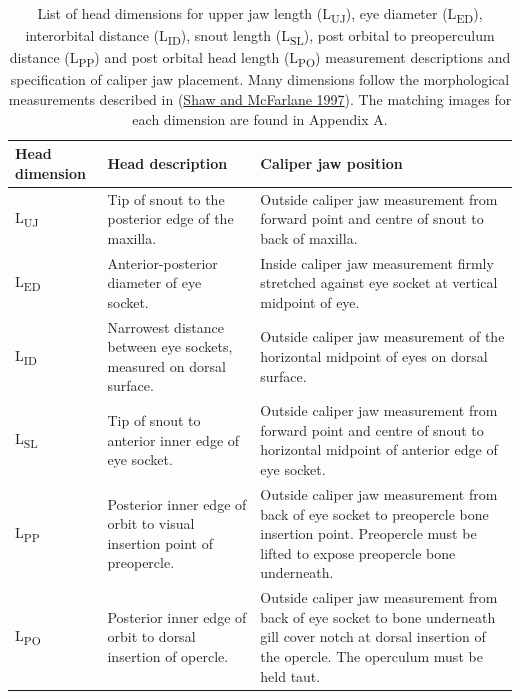 \documentclass[12pt]{article}\usepackage[]{graphicx}\usepackage[]{color}
\begin{document}
\begin{table}[!h]

\caption{\label{tab:table1}List of head dimensions for upper jaw length (L\textsubscript{UJ}), eye diameter (L\textsubscript{ED}), interorbital distance (L\textsubscript{ID}), snout length (L\textsubscript{SL}), post orbital to preoperculum distance (L\textsubscript{PP}) and post orbital head length (L\textsubscript{PO}) measurement descriptions and specification of caliper jaw placement. Many dimensions follow the morphological measurements described in (\protect\hyperlink{ref-Shaw1997}{Shaw and McFarlane 1997}). The matching images for each dimension are found in Appendix A.}
\fontsize{10}{12}\selectfont
\begin{tabular}[t]{>{\raggedright\arraybackslash}p{1.9cm}>{\raggedright\arraybackslash}p{6.0cm}>{\raggedright\arraybackslash}p{7.5cm}}
\toprule
\textbf{Head dimension} & \textbf{Head description} & \textbf{Caliper jaw position}\\
\midrule
L\textsubscript{UJ} & Tip of snout to the posterior edge of the maxilla. & Outside caliper jaw measurement from forward point and centre of snout to back of maxilla.\\
\midrule
L\textsubscript{ED} & Anterior-posterior diameter of eye socket. & Inside caliper jaw measurement firmly stretched against eye socket at vertical midpoint of eye.\\
\midrule
L\textsubscript{ID} & Narrowest distance between eye sockets, measured on dorsal surface. & Outside caliper jaw measurement of the horizontal midpoint of eyes on dorsal surface.\\
\midrule
L\textsubscript{SL} & Tip of snout to anterior inner edge of eye socket. & Outside caliper jaw measurement from forward point and centre of snout to horizontal midpoint of anterior edge of eye socket.\\
\midrule
L\textsubscript{PP} & Posterior inner edge of orbit to visual insertion point of preopercle. & Outside caliper jaw measurement from back of eye socket to preopercle bone insertion point. Preopercle must be lifted to expose preopercle bone underneath.\\
\midrule
L\textsubscript{PO} & Posterior inner edge of orbit to dorsal insertion of opercle. & Outside caliper jaw measurement from back of eye socket to bone underneath gill cover notch at dorsal insertion of the opercle.  The operculum must be held taut.\\
\bottomrule
\end{tabular}
\end{table}
\clearpage
\end{document}
